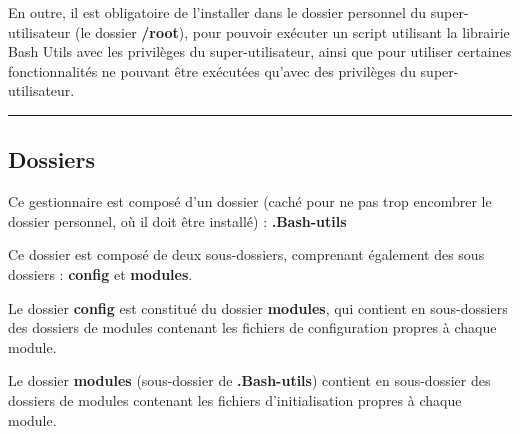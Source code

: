 \documentclass[a4paper,10pt]{article}
\begin{document}
    \begin{justify}
        En outre, il est obligatoire de l'installer dans le dossier personnel du super-utilisateur (le dossier \textbf{\color{path}/root}), pour pouvoir exécuter un script utilisant la librairie Bash Utils avec les privilèges du super-utilisateur, ainsi que pour utiliser certaines fonctionnalités ne pouvant être exécutées qu'avec des privilèges du super-utilisateur.
    \end{justify}




    \color{sec2}\par\noindent\rule{\textwidth}{0.4pt}\color{text}

    \color{sec2}
    \subsection{Dossiers}\color{text}

    \begin{justify}
        Ce gestionnaire est composé d'un dossier (caché pour ne pas trop encombrer le dossier personnel, où il doit être installé) : \textbf{\color{path}.Bash-utils}
    \end{justify}

    \begin{justify}
        Ce dossier est composé de deux sous-dossiers, comprenant également des sous dossiers : \textbf{\color{path}config} et \textbf{\color{path}modules}.
    \end{justify}

    \begin{justify}
        Le dossier \textbf{\color{path}config} est constitué du dossier \textbf{\color{path}modules}, qui contient en sous-dossiers des dossiers de modules contenant les fichiers de configuration propres à chaque module.
    \end{justify}

    \begin{justify}
        Le dossier \textbf{\color{path}modules} (sous-dossier de \textbf{\color{path}.Bash-utils}) contient en sous-dossier des dossiers de modules contenant les fichiers d'initialisation propres à chaque module.
    \end{justify}

\end{document}
